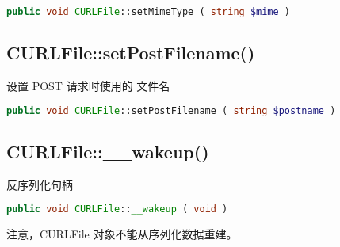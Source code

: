 \begin{lstlisting}[language=PHP]
public void CURLFile::setMimeType ( string $mime )
\end{lstlisting}


\subsection{CURLFile::setPostFilename()}

设置 POST 请求时使用的 文件名

\begin{lstlisting}[language=PHP]
public void CURLFile::setPostFilename ( string $postname )
\end{lstlisting}



\subsection{CURLFile::\_\_wakeup()}

反序列化句柄

\begin{lstlisting}[language=PHP]
public void CURLFile::__wakeup ( void )
\end{lstlisting}

注意，CURLFile 对象不能从序列化数据重建。




